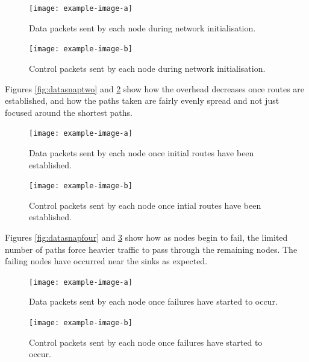 \documentclass[12pt]{article}
\begin{document}
\begin{figure}[!ht]
    \centering
    \begin{minipage}{0.45\textwidth}
        \centering
        \texttt{[image: example-image-a]} %
        \caption{Data packets sent by each node during network initialisation.}
        \label{fig:datasnapone}
    \end{minipage}\hfill
    \begin{minipage}{0.45\textwidth}
        \centering
        \texttt{[image: example-image-b]} %
        \caption{Control packets sent by each node during network initialisation.}
        \label{fig:ctrlsnapone}
    \end{minipage}
\end{figure}

Figures \ref{fig:datasnaptwo} and \ref{fig:ctrlsnaptwo} show how the overhead decreases once routes are established, and how the paths taken are fairly evenly spread and not just focused around the shortest paths. 

\begin{figure}[!ht]
    \centering
    \begin{minipage}{0.45\textwidth}
        \centering
        \texttt{[image: example-image-a]} %
        \caption{Data packets sent by each node once initial routes have been established.}
        \label{fig:datasnaptwo}
    \end{minipage}\hfill
    \begin{minipage}{0.45\textwidth}
        \centering
       \texttt{[image: example-image-b]} %
        \caption{Control packets sent by each node once intial routes have been established.}
        \label{fig:ctrlsnaptwo}
    \end{minipage}
\end{figure}

Figures \ref{fig:datasnapfour} and \ref{fig:ctrlsnapfour} show how as nodes begin to fail, the limited number of paths force heavier traffic to pass through the remaining nodes. The failing nodes have occurred near the sinks as expected.

\begin{figure}[!ht]
    \centering
    \begin{minipage}{0.45\textwidth}
        \centering
        \texttt{[image: example-image-a]} %
        \caption{Data packets sent by each node once failures have started to occur.}
        \label{fig:datasnapfour}
    \end{minipage}\hfill
    \begin{minipage}{0.45\textwidth}
        \centering
        \texttt{[image: example-image-b]} %
        \caption{Control packets sent by each node once failures have started to occur.}
        \label{fig:ctrlsnapfour}
    \end{minipage}
\end{figure}
\end{document}
